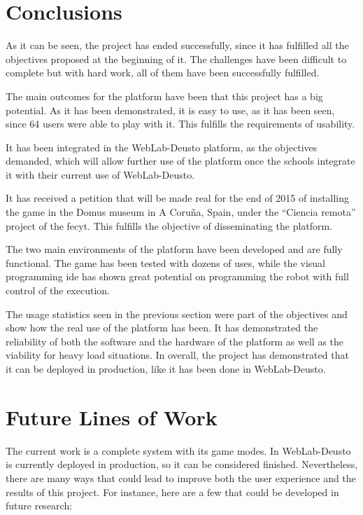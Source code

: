 \section{Conclusions}

As it can be seen, the project has ended successfully, since it has fulfilled all the objectives
proposed at the beginning of it. The challenges have been difficult to complete but with hard work,
all of them have been successfully fulfilled.

The main outcomes for the platform have been that this project has a big potential. As it has been
demonstrated, it is easy to use, as it has been seen, since 64 users were able to play with it. This
fulfills the requirements of usability.

It has been integrated in the WebLab-Deusto platform, as the objectives demanded, which will allow
further use of the platform once the schools integrate it with their current use of WebLab-Deusto.

It has received a petition that will be made real for the end of 2015 of installing the game in
the Domus museum in A Coruña, Spain, under the ``Ciencia remota'' project of the \acrshort{fecyt}.
This fulfills the objective of disseminating the platform.

The two main environments of the platform have been developed and are fully functional. The game has
been tested with dozens of uses, while the visual programming \acrshort{ide} has shown great
potential on programming the robot with full control of the execution.

The usage statistics seen in the previous section were part of the objectives and show how the real
use of the platform has been. It has demonstrated the reliability of both the software and the
hardware of the platform as well as the viability for heavy load situations. In overall, the project
has demonstrated that it can be deployed in production, like it has been done in WebLab-Deusto.

\section{Future Lines of Work}

The current work is a complete system with its game modes. In WebLab-Deusto is currently deployed in
production, so it can be considered finished. Nevertheless, there are many ways that could lead to
improve both the user experience and the results of this project. For instance, here are a few that
could be developed in future research:

